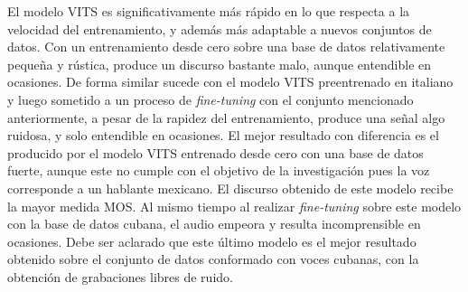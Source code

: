 El modelo VITS es significativamente más rápido en lo que respecta a la velocidad del entrenamiento, y además más adaptable a nuevos conjuntos de datos. Con un entrenamiento desde cero sobre una base de datos relativamente pequeña y rústica, produce un discurso bastante malo, aunque entendible en ocasiones. De forma similar sucede con el modelo VITS preentrenado en italiano y luego sometido a un proceso de \textit{fine-tuning} con el conjunto mencionado anteriormente, a pesar de la rapidez del entrenamiento, produce una señal algo ruidosa, y solo entendible en ocasiones. El mejor resultado con diferencia es el producido por el modelo VITS entrenado desde cero con una base de datos fuerte, aunque este no cumple con el objetivo de la investigación pues la voz corresponde a un hablante mexicano. El discurso obtenido de este modelo recibe la mayor medida MOS. Al mismo tiempo al realizar \textit{fine-tuning} sobre este modelo con la base de datos cubana, el audio empeora y resulta incomprensible en ocasiones. Debe ser aclarado que este último modelo es el mejor resultado obtenido sobre el conjunto de datos conformado con voces cubanas, con la obtención de grabaciones libres de ruido. 




